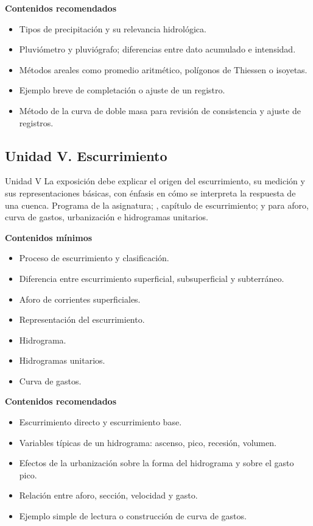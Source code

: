 \documentclass[11pt]{article}
\begin{document}
\textbf{Contenidos recomendados}
\begin{itemize}
\item Tipos de precipitación y su relevancia hidrológica.
\item Pluviómetro y pluviógrafo; diferencias entre dato acumulado e intensidad.
\item Métodos areales como promedio aritmético, polígonos de Thiessen o isoyetas.
\item Ejemplo breve de completación o ajuste de un registro.
\item Método de la curva de doble masa para revisión de consistencia y ajuste de registros.
\end{itemize}

\subsection{Unidad V. Escurrimiento}
\unitbox
{Unidad V}
{La exposición debe explicar el origen del escurrimiento, su medición y sus representaciones básicas, con énfasis en cómo se interpreta la respuesta de una cuenca.}
{Programa de la asignatura; \textcite{aparicio1989}, capítulo de escurrimiento; \textcite{chow1994} y \textcite{mays2011} para aforo, curva de gastos, urbanización e hidrogramas unitarios.}

\textbf{Contenidos mínimos}
\begin{itemize}
\item Proceso de escurrimiento y clasificación.
\item Diferencia entre escurrimiento superficial, subsuperficial y subterráneo.
\item Aforo de corrientes superficiales.
\item Representación del escurrimiento.
\item Hidrograma.
\item Hidrogramas unitarios.
\item Curva de gastos.
\end{itemize}

\textbf{Contenidos recomendados}
\begin{itemize}
\item Escurrimiento directo y escurrimiento base.
\item Variables típicas de un hidrograma: ascenso, pico, recesión, volumen.
\item Efectos de la urbanización sobre la forma del hidrograma y sobre el gasto pico.
\item Relación entre aforo, sección, velocidad y gasto.
\item Ejemplo simple de lectura o construcción de curva de gastos.
\end{itemize}
\end{document}
